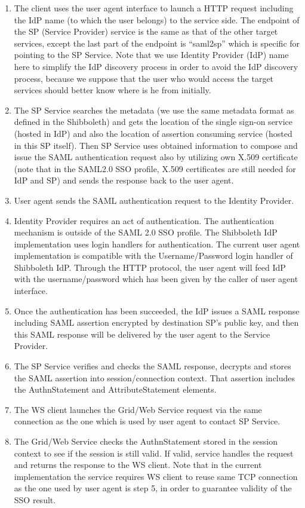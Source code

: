 \documentclass[twocolumn]{svjour3}         %
\begin{document}
\begin{enumerate}
\item The client uses the user agent interface to launch a HTTP request including the IdP name (to which the user belongs) to the service side. The endpoint of the SP (Service Provider) service is the same as that of the other target services, except the last part of the endpoint is ``saml2sp'' which is specific for pointing to the SP Service. Note that we use Identity Provider (IdP) name here to simplify the IdP discovery process in order to avoid the IdP discovery process, because we suppose that the user who would access the target services should better know where is he from initially.
\item The SP Service searches the metadata (we use the same metadata format as defined in the Shibboleth) and gets the location of the single sign-on service (hosted in IdP) and also the location of assertion consuming service (hosted in this SP itself). Then SP Service uses obtained information to compose and issue the SAML authentication request also by utilizing own X.509 certificate (note that in the SAML2.0 SSO profile, X.509 certificates are still needed for IdP and SP) and sends the response back to the user agent.
\item User agent sends the SAML authentication request to the Identity Provider.
\item Identity Provider requires an act of authentication. The authentication mechanism is outside of the SAML 2.0 SSO profile. The Shibboleth IdP implementation uses login handlers for authentication. The current user agent implementation is compatible with the Username/Password login handler of Shibboleth IdP. Through the HTTP protocol, the user agent will feed IdP with the username/password which has been given by the caller of user agent interface.
\item Once the authentication has been succeeded, the IdP issues a SAML response including SAML assertion encrypted by destination SP’s public key, and then this SAML response will be delivered by the user agent to the Service Provider.
\item The SP Service verifies and checks the SAML response, decrypts and stores the SAML assertion into session/connection context. That assertion includes the AuthnStatement and AttributeStatement elements.
\item The WS client launches the Grid/Web Service request via the same connection as the one which is used by user agent to contact SP Service.
\item The Grid/Web Service checks the AuthnStatement stored in the session context to see if the session is still valid. If valid, service handles the  request and returns the response to the WS client. Note that in the current implementation the service requires WS client to reuse same TCP connection as the one used by user agent is step 5, in order to guarantee  validity of the SSO result.
\end{enumerate}
\end{document}
